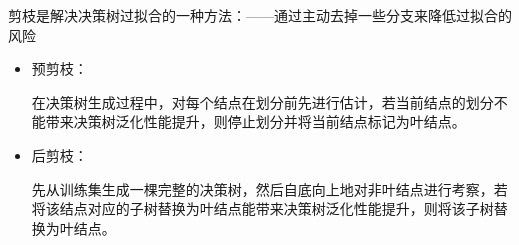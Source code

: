 \begin{note}
    剪枝是解决决策树过拟合的一种方法：——通过主动去掉一些分支来降低过拟合的风险

    \begin{itemize}
        \item 预剪枝：
        
        在决策树生成过程中，对每个结点在划分前先进行估计，若当前结点的划分不能带来决策树泛化性能提升，则停止划分并将当前结点标记为叶结点。
        \item 后剪枝：
        
        先从训练集生成一棵完整的决策树，然后自底向上地对非叶结点进行考察，若将该结点对应的子树替换为叶结点能带来决策树泛化性能提升，则将该子树替换为叶结点。
    \end{itemize}
\end{note}

